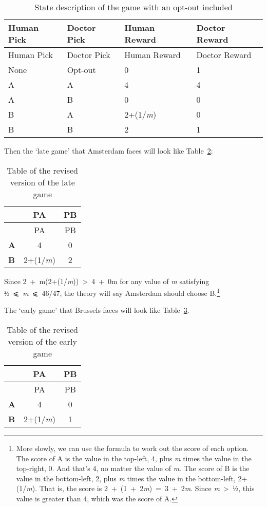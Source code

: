 \documentclass[
  11pt,
  letterpaper,
  DIV=11,
  numbers=noendperiod,
  twoside]{scrartcl}
\begin{document}
\begin{longtable}[]{@{}llll@{}}
\caption{State description of the game with an opt-out
included}\label{tbl-revised-game}\tabularnewline
\toprule\noalign{}
Human Pick & Doctor Pick & Human Reward & Doctor Reward \\
\midrule\noalign{}
\endfirsthead
\toprule\noalign{}
Human Pick & Doctor Pick & Human Reward & Doctor Reward \\
\midrule\noalign{}
\endhead
\bottomrule\noalign{}
\endlastfoot
None & Opt-out & 0 & 1 \\
A & A & 4 & 4 \\
A & B & 0 & 0 \\
B & A & 2+(1/\emph{m}) & 0 \\
B & B & 2 & 1 \\
\end{longtable}

Then the `late game' that Amsterdam faces will look like
Table~\ref{tbl-revised-late}:

\begin{longtable}[]{@{}lcc@{}}
\caption{Table of the revised version of the late
game}\label{tbl-revised-late}\tabularnewline
\toprule\noalign{}
& PA & PB \\
\midrule\noalign{}
\endfirsthead
\toprule\noalign{}
& PA & PB \\
\midrule\noalign{}
\endhead
\bottomrule\noalign{}
\endlastfoot
\textbf{A} & 4 & 0 \\
\textbf{B} & 2+(1/\emph{m}) & 2 \\
\end{longtable}

Since 2~+~m(2+(1/\emph{m}))~\textgreater~4~+~0m for any value of
\emph{m} satisfying ⅔~⩽~\emph{m}~⩽~46/47, the theory will say Amsterdam
should choose B.\footnote{More slowly, we can use the formula to work
  out the score of each option. The score of A is the value in the
  top-left, 4, plus \emph{m} times the value in the top-right, 0. And
  that's 4, no matter the value of \emph{m}. The score of B is the value
  in the bottom-left, 2, plus \emph{m} times the value in the
  bottom-left, 2+(1/\emph{m}). That is, the score is
  2~+~(1~+~2\emph{m})~=~3~+~2\emph{m}. Since \emph{m}~\textgreater~½,
  this value is greater than 4, which was the score of A.}

The `early game' that Brussels faces will look like
Table~\ref{tbl-revised-early}.

\begin{longtable}[]{@{}lcc@{}}
\caption{Table of the revised version of the early
game}\label{tbl-revised-early}\tabularnewline
\toprule\noalign{}
& PA & PB \\
\midrule\noalign{}
\endfirsthead
\toprule\noalign{}
& PA & PB \\
\midrule\noalign{}
\endhead
\bottomrule\noalign{}
\endlastfoot
\textbf{A} & 4 & 0 \\
\textbf{B} & 2+(1/\emph{m}) & 1 \\
\end{longtable}
\end{document}
